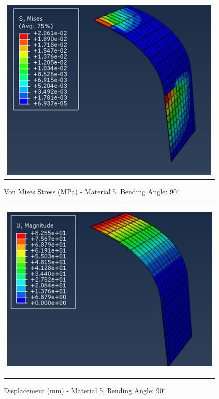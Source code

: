 \documentclass[a4paper,12pt]{article}
\numberwithin{equation}{section}
\numberwithin{figure}{section}
\begin{document}
\begin{figure}[H]
  \centering
  \begin{tabular}{@{}c@{}}
    \includegraphics[width=0.7\linewidth,height=255pt]{Results/Bending/M5_VMS_90.png} \\
  \end{tabular}
  \caption{Von Mises Stress (MPa) - Material 5,  Bending Angle: 90$^{\circ}$ }
\end{figure}

\begin{figure}[H]
  \centering
  \begin{tabular}{@{}c@{}}
    \includegraphics[width=0.7\linewidth,height=255pt]{Results/Bending/M5_DIS_90.png} \\
  \end{tabular}
  \caption{Displacement (mm) - Material 5, Bending Angle: 90$^{\circ}$ }
\end{figure}

\end{document}
